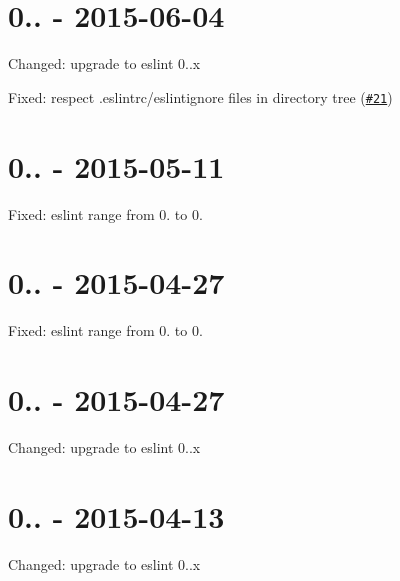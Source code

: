 \section*{0.. -\/ 2015-\/06-\/04}


\begin{DoxyItemize}
\item Changed\+: upgrade to eslint 0..\+x
\item Fixed\+: respect .eslintrc/eslintignore files in directory tree (\href{https://github.com/MoOx/eslint-loader/issues/21}{\tt \#21})
\end{DoxyItemize}

\section*{0.. -\/ 2015-\/05-\/11}


\begin{DoxyItemize}
\item Fixed\+: eslint range from 0. to 0.
\end{DoxyItemize}

\section*{0.. -\/ 2015-\/04-\/27}


\begin{DoxyItemize}
\item Fixed\+: eslint range from 0. to 0.
\end{DoxyItemize}

\section*{0.. -\/ 2015-\/04-\/27}


\begin{DoxyItemize}
\item Changed\+: upgrade to eslint 0..\+x
\end{DoxyItemize}

\section*{0.. -\/ 2015-\/04-\/13}


\begin{DoxyItemize}
\item Changed\+: upgrade to eslint 0..\+x
\end{DoxyItemize}

